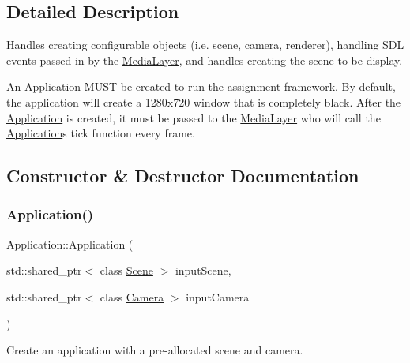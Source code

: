 \subsection{Detailed Description}
Handles creating configurable objects (i.\+e. scene, camera, renderer), handling S\+DL events passed in by the \hyperlink{class_media_layer}{Media\+Layer}, and handles creating the scene to be display. 

An \textquotesingle{}\hyperlink{class_application}{Application}\textquotesingle{} M\+U\+ST be created to run the assignment framework. By default, the application will create a 1280x720 window that is completely black. After the \textquotesingle{}\hyperlink{class_application}{Application}\textquotesingle{} is created, it must be passed to the \textquotesingle{}\hyperlink{class_media_layer}{Media\+Layer}\textquotesingle{} who will call the \textquotesingle{}\hyperlink{class_application}{Application}\textquotesingle{}s tick function every frame. 

\subsection{Constructor \& Destructor Documentation}
\hypertarget{class_application_a78cdcb03e6f06272f7c528fe407951c5}{}\label{class_application_a78cdcb03e6f06272f7c528fe407951c5} 
\subsubsection{\texorpdfstring{Application()}{Application()}}
{\footnotesize\ttfamily Application\+::\+Application (\begin{DoxyParamCaption}\item[{std\+::shared\+\_\+ptr$<$ class \hyperlink{class_scene}{Scene} $>$}]{input\+Scene,  }\item[{std\+::shared\+\_\+ptr$<$ class \hyperlink{class_camera}{Camera} $>$}]{input\+Camera }\end{DoxyParamCaption})}



Create an application with a pre-\/allocated scene and camera. 


